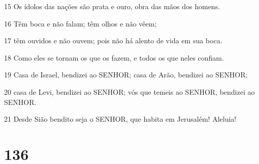 \par 15 Os ídolos das nações são prata e ouro, obra das mãos dos homens.
\par 16 Têm boca e não falam; têm olhos e não vêem;
\par 17 têm ouvidos e não ouvem; pois não há alento de vida em sua boca.
\par 18 Como eles se tornam os que os fazem, e todos os que neles confiam.
\par 19 Casa de Israel, bendizei ao SENHOR; casa de Arão, bendizei ao SENHOR;
\par 20 casa de Levi, bendizei ao SENHOR; vós que temeis ao SENHOR, bendizei ao SENHOR.
\par 21 Desde Sião bendito seja o SENHOR, que habita em Jerusalém! Aleluia!

\chapter{136}


